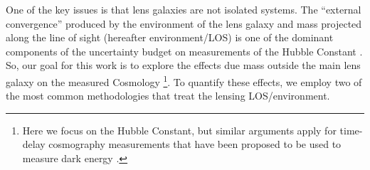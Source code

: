 One of the key issues is that lens galaxies are not isolated systems. The ``external convergence'' produced by the environment of the lens galaxy and mass projected along the line of sight (hereafter environment/LOS) is one of the dominant components of the uncertainty budget on measurements of the Hubble Constant \citep{Suyu12}. So, our goal for this work is to explore the effects due mass outside the main lens galaxy on the measured Cosmology \footnote{Here we focus on the Hubble Constant, but similar arguments apply for time-delay cosmography measurements that have been proposed to be used to measure dark energy \citep{Treu13}.}. To quantify these effects, we employ two of the most common methodologies that treat the lensing LOS/environment.